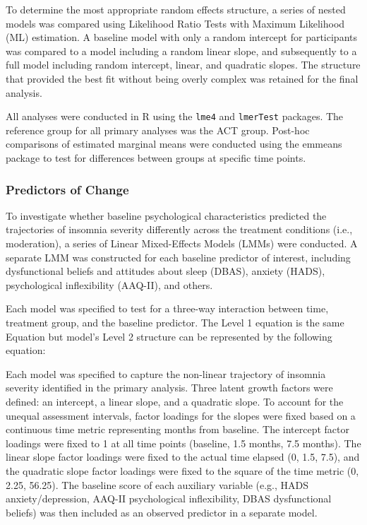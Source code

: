 \documentclass[
  man]{apa6}
\begin{document}
To determine the most appropriate random effects structure, a series of nested models was compared using Likelihood Ratio Tests with Maximum Likelihood (ML) estimation. A baseline model with only a random intercept for participants was compared to a model including a random linear slope, and subsequently to a full model including random intercept, linear, and quadratic slopes. The structure that provided the best fit without being overly complex was retained for the final analysis.

All analyses were conducted in R using the \texttt{lme4} and \texttt{lmerTest} packages. The reference group for all primary analyses was the ACT group. Post-hoc comparisons of estimated marginal means were conducted using the emmeans package to test for differences between groups at specific time points.

\subsubsection{Predictors of Change}\label{predictors-of-change}

To investigate whether baseline psychological characteristics predicted the trajectories of insomnia severity differently across the treatment conditions (i.e., moderation), a series of Linear Mixed-Effects Models (LMMs) were conducted. A separate LMM was constructed for each baseline predictor of interest, including dysfunctional beliefs and attitudes about sleep (DBAS), anxiety (HADS), psychological inflexibility (AAQ-II), and others.

Each model was specified to test for a three-way interaction between time, treatment group, and the baseline predictor. The Level 1 equation is the same Equation but model's Level 2 structure can be represented by the following equation:

Each model was specified to capture the non-linear trajectory of insomnia severity identified in the primary analysis. Three latent growth factors were defined: an intercept, a linear slope, and a quadratic slope. To account for the unequal assessment intervals, factor loadings for the slopes were fixed based on a continuous time metric representing months from baseline. The intercept factor loadings were fixed to 1 at all time points (baseline, 1.5 months, 7.5 months). The linear slope factor loadings were fixed to the actual time elapsed (0, 1.5, 7.5), and the quadratic slope factor loadings were fixed to the square of the time metric (0, 2.25, 56.25). The baseline score of each auxiliary variable (e.g., HADS anxiety/depression, AAQ-II psychological inflexibility, DBAS dysfunctional beliefs) was then included as an observed predictor in a separate model.
\end{document}
